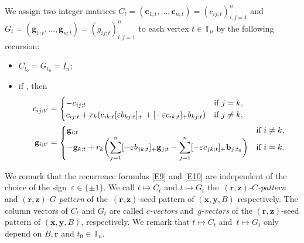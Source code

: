 \documentclass[pdftex]{sigma}
\numberwithin{equation}{section}
\begin{document}
We assign two integer matrices $C_t=(\mathbf{c}_{1;t},\dots,\mathbf{c}_{n;t} )=(c_{ij;t})_{i,j=1}^n$ and $G_t=(\mathbf{g}_{1;t},\dots, \mathbf{g}_{n;t})=(g_{ij;t})_{i,j=1}^n$ to each vertex $t\in \mathbb{T}_n$ by the following recursion:
\begin{itemize}\itemsep=0pt
 \item $C_{t_0}=G_{t_0}=I_n$;
 \item if , then
 \begin{align}
 c_{ij:t'}&=
 \begin{cases}
 -c_{ij;t} & \text{if $j=k$},\\
 c_{ij;t}+r_k(c_{ik;t}[\varepsilon b_{kj;t}]_++[-\varepsilon c_{ik;t}]_+b_{kj;t})& \text{if $ j\neq k$},
 \end{cases}\label{E9}\\
 \mathbf{g}_{i;t'}&=
 \begin{cases}
 \mathbf{g}_{i;t} & \text{if $i\neq k$},\\
 \displaystyle-\mathbf{g}_{k;t}+r_k\biggl(\sum\limits_{j=1}^{n}[-\varepsilon b_{jk;t}]_+\mathbf{g}_{j;t}-\sum\limits_{j=1}^{n}[-\varepsilon c_{jk;t}]_+\mathbf{b}_{j;t_0}\biggr) & \text{if $i=k$}.
 \end{cases}\label{E10}
 \end{align}
\end{itemize}
We remark that the recurrence formulas \eqref{E9} and \eqref{E10} are independent of the choice of the sign~${\varepsilon\in \{\pm 1\}}$.
We call $t\mapsto C_t$ and $t\mapsto G_t$ the~{\it $(\mathbf{r},\mathbf{z})$-$C$-pattern} and {\it $(\mathbf{r},\mathbf{z})$-$G$-pattern} of the~$(\mathbf{r},\mathbf{z})$-seed pattern of $(\mathbf{x},\mathbf{y}, B)$ respectively.
The column vectors of $C_t$ and $G_t$ are called {\it $c$-vectors} and~{\it $g$-vectors} of the $(\mathbf{r},\mathbf{z})$-seed pattern of $(\mathbf{x},\mathbf{y}, B)$, respectively. We remark that $t\mapsto C_t$ and~${t\mapsto G_t}$ only depend on $B, \mathbf{r}$ and $t_0\in \mathbb{T}_n$.
\end{document}
